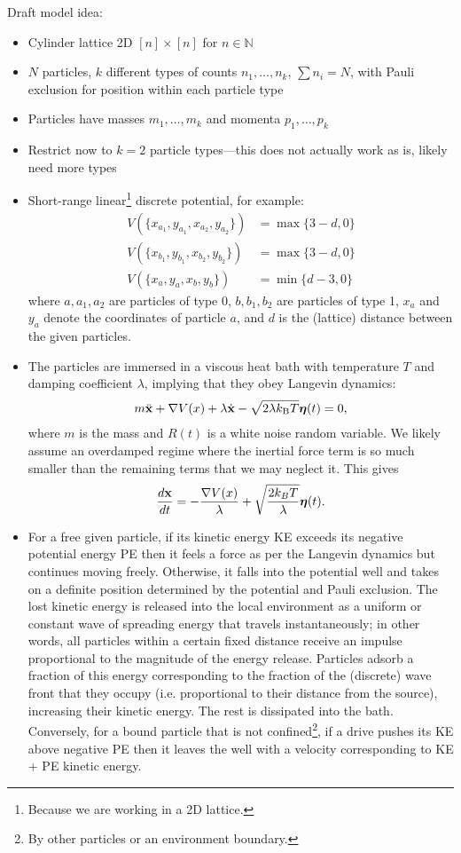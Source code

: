 \documentclass[12pt,letterpaper]{article}
\begin{document}
Draft model idea:
\begin{itemize}
\item Cylinder lattice 2D $[n] \times [n]$ for $n \in \mathbb{N}$
\item $N$ particles, $k$ different types of counts $n_{1}, \ldots, n_{k}$, $\sum n_{i} = N$, with Pauli exclusion for position within each particle type
\item Particles have masses $m_{1}, \ldots, m_{k}$ and momenta $p_{1}, \ldots, p_{k}$
\item Restrict now to $k = 2$ particle types---this does not actually work as is, likely need more types
\item Short-range linear\footnote{Because we are working in a 2D lattice.} discrete potential, for example:
\begin{align*}
V(\{x_{a_{1}}, y_{a_{1}}, x_{a_{2}}, y_{a_{2}}\}) &= \max\{3-d, 0\} \\
V(\{x_{b_{1}}, y_{b_{1}}, x_{b_{2}}, y_{b_{2}}\}) &= \max\{3-d, 0\} \\
V(\{x_{a}, y_{a}, x_{b}, y_{b}\}) &= \min\{d-3, 0\}
\end{align*}
where $a, a_{1}, a_{2}$ are particles of type 0, $b, b_{1}, b_{2}$ are particles of type 1, $x_{a}$ and $y_{a}$ denote the coordinates of particle $a$, and $d$ is the (lattice) distance between the given particles.
\item The particles are immersed in a viscous heat bath with temperature $T$ and damping coefficient $\lambda$, implying that they obey Langevin dynamics:
\begin{align*}
m\ddot{\mathbf{x}} + \nabla V(x) + \lambda\dot{\mathbf{x}} - \sqrt{2\lambda k_{\textnormal{B}}T}\boldsymbol{\eta}(t) = 0,
\end{align*}
where $m$ is the mass and $R(t)$ is a white noise random variable. We likely assume an overdamped regime where the inertial force term is so much smaller than the remaining terms that we may neglect it. This gives
\begin{align*}
{d\mathbf{x} \over dt} = -{\nabla V(x) \over \lambda} + \sqrt{2 k_{B}T\over \lambda}\boldsymbol{\eta}(t).
\end{align*}
\item For a free given particle, if its kinetic energy KE exceeds its negative potential energy PE then it feels a force as per the Langevin dynamics but continues moving freely. Otherwise, it falls into the potential well and takes on a definite position determined by the potential and Pauli exclusion. The lost kinetic energy is released into the local environment as a uniform or constant wave of spreading energy that travels instantaneously; in other words, all particles within a certain fixed distance receive an impulse proportional to the magnitude of the energy release. Particles adsorb a fraction of this energy corresponding to the fraction of the (discrete) wave front that they occupy (i.e. proportional to their distance from the source), increasing their kinetic energy. The rest is dissipated into the bath. Conversely, for a bound particle that is not confined\footnote{By other particles or an environment boundary.}, if a drive pushes its KE above negative PE then it leaves the well with a velocity corresponding to KE + PE kinetic energy.

\end{itemize}
\end{document}
